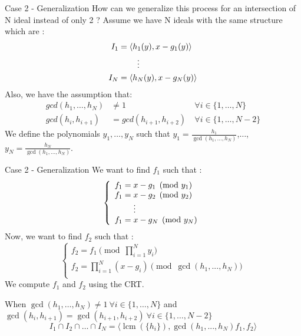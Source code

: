 \documentclass{beamer}
\DeclareMathOperator{\lcm}{lcm}
\begin{document}
\begin{frame}{Case 2 - Generalization}
How can we generalize this process for an intersection of N ideal instead of only 2 ?
Assume we have N ideals with the same structure which are :
\begin{align*}
    I_{1} & = \langle h_{1}(y),x-g_{1}(y) \rangle    \\
          & \hspace{8mm} \vdots                      \\
    I_{N} & = \langle h_{N}(y),x-g_{N}(y) \rangle
\end{align*}
Also, we have the assumption that: 
\begin{align*}
    gcd(h_{1},\dots,h_{N}) & \neq 1                 & \forall i \in \{1,\dots,N\} \\
    gcd(h_{i},h_{i+1})     & =gcd(h_{i+1},h_{i+2})\ & \forall i \in \{1,\dots,N-2\}
\end{align*}
 We define the polynomials $y_{1},\dots,y_{N}$ such that $y_{1} = \displaystyle \frac{h_{1}}{\gcd(h_{1},\dots,h_{N})}$,$\dots$, $y_{N} = \displaystyle \frac{h_{N}}{\gcd(h_{1},\dots,h_{N})}$.

\end{frame}

\begin{frame}{Case 2 - Generalization}
    We want to find $f_{1}$ such that :
\begin{displaymath}
    \left\{
    \begin{array}{ll}
        f_{1} = x-g_{1} \pmod {y_{1}} \\
        f_{1} = x-g_{2} \pmod {y_{2}} \\
        \hspace{8mm} \vdots \\
        f_{1} = x-g_{N} \pmod{y_{N}}\\
    \end{array}
    \right.
\end{displaymath}
    Now, we want to find $f_{2}$ such that :
\begin{displaymath}
    \left\{
    \begin{array}{ll}
        f_{2} = f_{1} \pmod {\prod_{i=1}^{N} y_{i}} \\
        f_{2} = \prod^{N}_{i=1} (x-g_{i}) \pmod {\gcd(h_{1},...,h_{N})} \\
    \end{array}
    \right.
\end{displaymath}
We compute $f_1$ and $f_2$ using the CRT.

\begin{theorem}
    When $\gcd(h_{1},\dots,h_{N})\neq1\ \forall i \in \{1,\dots,N\}$ and $\gcd(h_{i},h_{i+1}) = \gcd(h_{i+1},h_{i+2})\ \forall i \in \{1,\dots,N-2\}$
    \begin{displaymath}
        I_{1} \cap I_{2} \cap \dots \cap I_{N} = \langle \lcm(\{h_{i}\}), \gcd(h_{1},...,h_{N})f_{1},f_{2} \rangle
    \end{displaymath}
\end{theorem}
\end{frame}
\end{document}
